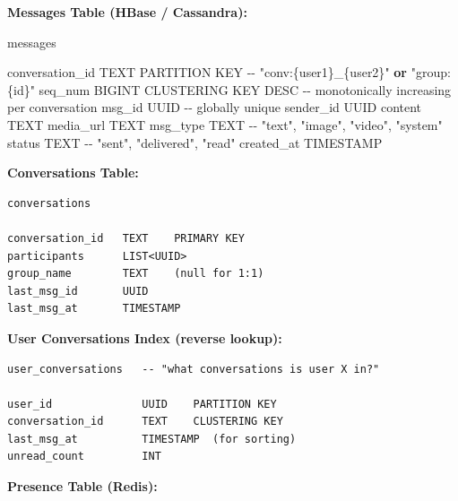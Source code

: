 \documentclass[11pt]{article}
\newenvironment{Shaded}{\begin{snugshade}}{\end{snugshade}}
\newcommand{\KeywordTok}[1]{\textcolor[rgb]{0.81,0.81,0.76}{\textbf{#1}}}
\newcommand{\NormalTok}[1]{\textcolor[rgb]{0.81,0.81,0.76}{#1}}
\newcommand{\OperatorTok}[1]{\textcolor[rgb]{0.81,0.81,0.76}{#1}}
\newcommand{\SpecialCharTok}[1]{\textcolor[rgb]{0.24,0.68,0.91}{#1}}
\newcommand{\StringTok}[1]{\textcolor[rgb]{0.96,0.31,0.31}{#1}}
\begin{document}
\textbf{Messages Table (HBase / Cassandra):}


\begin{Shaded}
\begin{Highlighting}[]
\NormalTok{messages}

\NormalTok{conversation\_id   TEXT       PARTITION KEY    }\OperatorTok{{-}{-}} \StringTok{"conv:}\SpecialCharTok{\{user1\}}\StringTok{\_}\SpecialCharTok{\{user2\}}\StringTok{"} \KeywordTok{or} \StringTok{"group:}\SpecialCharTok{\{id\}}\StringTok{"}
\NormalTok{seq\_num           BIGINT     CLUSTERING KEY DESC  }\OperatorTok{{-}{-}}\NormalTok{ monotonically increasing per conversation}
\NormalTok{msg\_id            UUID       }\OperatorTok{{-}{-}}\NormalTok{ globally unique}
\NormalTok{sender\_id         UUID}
\NormalTok{content           TEXT}
\NormalTok{media\_url         TEXT}
\NormalTok{msg\_type          TEXT       }\OperatorTok{{-}{-}} \StringTok{"text"}\NormalTok{, }\StringTok{"image"}\NormalTok{, }\StringTok{"video"}\NormalTok{, }\StringTok{"system"}
\NormalTok{status            TEXT       }\OperatorTok{{-}{-}} \StringTok{"sent"}\NormalTok{, }\StringTok{"delivered"}\NormalTok{, }\StringTok{"read"}
\NormalTok{created\_at        TIMESTAMP}
\end{Highlighting}
\end{Shaded}

\textbf{Conversations Table:}

\setcodelang{}

\begin{verbatim}
conversations

conversation_id   TEXT    PRIMARY KEY
participants      LIST<UUID>
group_name        TEXT    (null for 1:1)
last_msg_id       UUID
last_msg_at       TIMESTAMP
\end{verbatim}

\textbf{User Conversations Index (reverse lookup):}

\setcodelang{}

\begin{verbatim}
user_conversations   -- "what conversations is user X in?"

user_id              UUID    PARTITION KEY
conversation_id      TEXT    CLUSTERING KEY
last_msg_at          TIMESTAMP  (for sorting)
unread_count         INT
\end{verbatim}

\textbf{Presence Table (Redis):}

\end{document}
